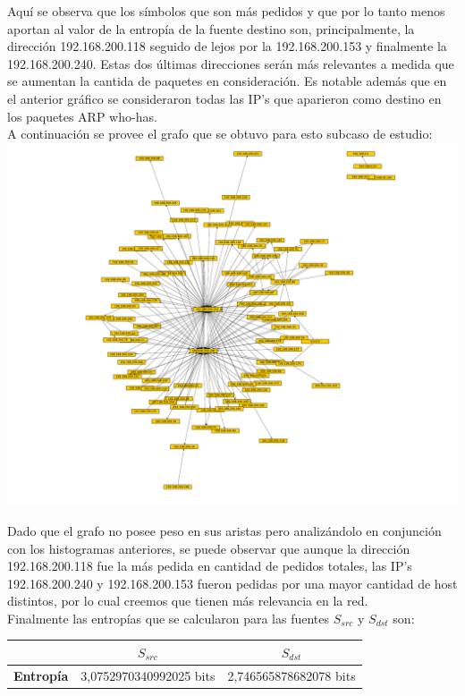\indent Aquí se observa que los símbolos que son más pedidos y que por lo tanto menos aportan al valor de la entropía de la fuente destino son, principalmente, la dirección 192.168.200.118 seguido de lejos por la 192.168.200.153 y finalmente la 192.168.200.240. Estas dos últimas direcciones serán más relevantes a medida que se aumentan la cantida de paquetes en consideración. Es notable además que en el anterior gráfico se consideraron todas las IP's que aparieron como destino en los paquetes ARP who-has.\\

\indent A continuación se provee el grafo que se obtuvo para esto subcaso de estudio:\\

\includegraphics[scale=0.7,clip=true,trim=140 0 0 0]{graphics/laburochico.pdf}


\indent Dado que el grafo no posee peso en sus aristas pero analizándolo en conjunción con los histogramas anteriores, se puede observar que aunque la dirección 192.168.200.118 fue la más pedida en cantidad de pedidos totales, las IP's 192.168.200.240 y 192.168.200.153 fueron pedidas por una mayor cantidad de host distintos, por lo cual creemos que tienen más relevancia en la red.\\

\indent Finalmente las entropías que se calcularon para las fuentes {$S_{src}$} y $S_{dst}$ son:\\

\begin{centering}
	\begin{tabular}{ | c | c | c |} \hline
	   & \textbf{$S_{src}$} & \textbf{$S_{dst}$} \\ \hline
	  	\textbf{Entropía} & 3,0752970340992025 bits & 2,746565878682078 bits\\ \hline
	\end{tabular}
\end{centering}



